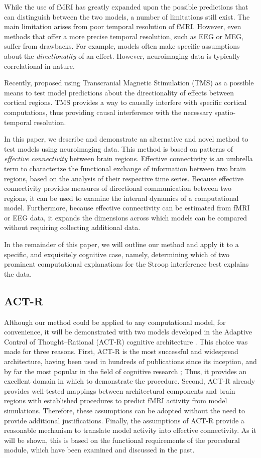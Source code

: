 \documentclass[10pt,letterpaper]{article}
\begin{document}
While the use of fMRI has greatly expanded upon the possible predictions that can distinguish between the two models, a number of limitations still exist. The main limitation arises from poor temporal resolution of fMRI.  However, even methods that offer a more precise temporal resolution, such as EEG or MEG, suffer from drawbacks. For example, models often make specific assumptions about the {\it directionality} of an effect. However, neuroimaging data is typically correlational in nature.

Recently,  proposed using Transcranial Magnetic Stimulation (TMS) as a possible means to test model predictions about the directionality of effects between cortical regions. TMS provides a way to causally interfere with specific cortical computations, thus providing causal interference with the necessary spatio-temporal resolution. 

In this paper, we describe and demonstrate an alternative and novel method to test models using neuroimaging data. This method is based on patterns of {\it effective connectivity} between brain regions. Effective connectivity is an umbrella term to characterize the functional exchange of information between two brain regions, based on the analysis of their respective time series. Because effective connectivity provides measures of directional communication between two regions, it can be used to examine the internal dynamics of a computational model.  Furthermore, because effective connectivity can be estimated from fMRI or EEG data, it expands the dimensions across which models can be compared without requiring collecting additional data.

In the remainder of this paper, we will outline our method and apply it to a specific, and exquisitely cognitive case, namely, determining which of two prominent computational explanations for the Stroop interference best explains the data.    

\subsection{ACT-R}

Although our method could be applied to any computational model, for convenience, it will be demonstrated with two models developed in the Adaptive Control of Thought--Rational (ACT-R) cognitive architecture \cite{Anderson2004}. This choice was made for three reasons.  First, ACT-R is the most successful and widespread architecture, having been used in hundreds of publications since its inception, and by far the most popular in the field of cognitive research \cite{Kotseruba2018}; Thus, it provides an excellent domain in which to demonstrate the procedure. Second, ACT-R already provides well-tested mappings between architectural components and brain regions with established procedures to predict fMRI activity from model simulations. Therefore, these assumptions can be adopted without the need to provide additional justifications. Finally, the assumptions of ACT-R provide a reasonable mechanism to translate model activity into effective connectivity. As it will be shown, this is based on the functional requirements of the procedural module, which have been examined and discussed in the past.
\end{document}
